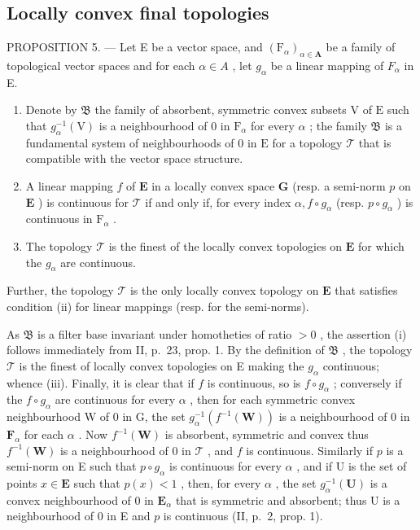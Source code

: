 \subsection{Locally convex final topologies}

PROPOSITION 5. --- Let E be a vector space, and \((\mathrm{F}_{\alpha})_{\alpha\in\mathbf{A}}\) be a family of topological vector spaces and for each \(\alpha\in A\) , let \(g_{\alpha}\) be a linear mapping of \(F_{\alpha}\) in E.

\begin{enumerate}
\def\labelenumi{(\roman{enumi})}
\item
  Denote by \(\mathfrak{B}\) the family of absorbent, symmetric convex subsets \(\mathrm{V}\) of \(\mathrm{E}\) such that \(g_{\alpha}^{-1}(\mathrm{V})\) is a neighbourhood of 0 in \(\mathrm{F}_{\alpha}\) for every \(\alpha\) ; the family \(\mathfrak{B}\) is a fundamental system of neighbourhoods of 0 in \(\mathrm{E}\) for a topology \(\mathcal{T}\) that is compatible with the vector space structure.
\item
  A linear mapping \(f\) of \(\mathbf{E}\) in a locally convex space \(\mathbf{G}\) (resp. a semi-norm \(p\) on \(\mathbf{E}\) ) is continuous for \(\mathcal{T}\) if and only if, for every index \(\alpha, f \circ g_{\alpha}\) (resp. \(p \circ g_{\alpha}\) ) is continuous in \(\mathrm{F}_{\alpha}\) .
\item
  The topology \(\mathcal{T}\) is the finest of the locally convex topologies on \(\mathbf{E}\) for which the \(g_{\alpha}\) are continuous.
\end{enumerate}

Further, the topology \(\mathcal{T}\) is the only locally convex topology on \(\mathbf{E}\) that satisfies condition (ii) for linear mappings (resp. for the semi-norms).

As \(\mathfrak{B}\) is a filter base invariant under homotheties of ratio \(>0\) , the assertion (i) follows immediately from II, p.~23, prop. 1. By the definition of \(\mathfrak{B}\) , the topology \(\mathcal{T}\) is the finest of locally convex topologies on E making the \(g_{\alpha}\) continuous; whence (iii). Finally, it is clear that if \(f\) is continuous, so is \(f \circ g_{\alpha}\) ; conversely if the \(f \circ g_{\alpha}\) are continuous for every \(\alpha\) , then for each symmetric convex neighbourhood W of 0 in G, the set \(g_{\alpha}^{-1}(f^{-1}(\mathbf{W}))\) is a neighbourhood of 0 in \(\mathbf{F}_{\alpha}\) for each \(\alpha\) . Now \(f^{-1}(\mathbf{W})\) is absorbent, symmetric and convex thus \(f^{-1}(\mathbf{W})\) is a neighbourhood of 0 in \(\mathcal{T}\) , and \(f\) is continuous. Similarly if \(p\) is a semi-norm on E such that \(p \circ g_{\alpha}\) is continuous for every \(\alpha\) , and if U is the set of points \(x \in \mathbf{E}\) such that \(p(x) < 1\) , then, for every \(\alpha\) , the set \(g_{\alpha}^{-1}(\mathbf{U})\) is a convex neighbourhood of 0 in \(\mathbf{E}_{\alpha}\) that is symmetric and absorbent; thus U is a neighbourhood of 0 in E and \(p\) is continuous (II, p.~2, prop. 1).

